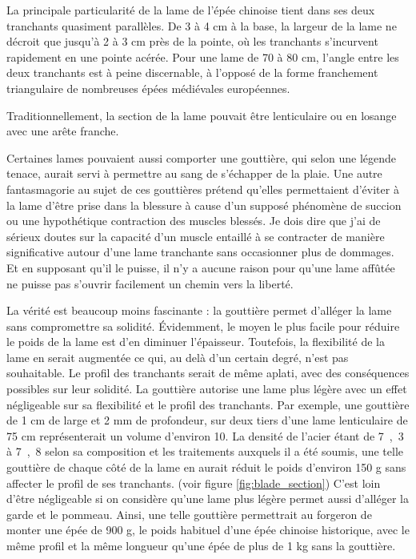 La principale particularité de la lame de l'épée chinoise tient dans ses deux tranchants quasiment parallèles. De 3 à 4 cm à la base, la largeur de la lame ne décroit que jusqu'à 2 à 3 cm près de la pointe, où les tranchants s'incurvent rapidement en une pointe acérée. 
Pour une lame de 70 à 80 cm, l'angle entre les deux tranchants est à peine discernable, à l'opposé de la forme franchement triangulaire de nombreuses épées médiévales européennes. 

Traditionnellement, la section de la lame pouvait être lenticulaire ou en losange avec une arête franche. 

Certaines lames pouvaient aussi comporter une gouttière, qui selon une légende tenace, aurait servi à permettre au sang de s'échapper de la plaie.
Une autre fantasmagorie au sujet de ces gouttières prétend qu'elles permettaient d'éviter à la lame d'être prise dans la blessure à cause d'un supposé phénomène de succion ou une hypothétique contraction des muscles blessés.
Je dois dire que j'ai de sérieux doutes sur la capacité d'un muscle entaillé à se contracter de manière significative autour d'une lame tranchante sans occasionner plus de dommages. Et en supposant qu'il le puisse, il n'y a aucune raison pour qu'une lame affûtée ne puisse pas s'ouvrir facilement un chemin vers la liberté.

La vérité est beaucoup moins fascinante : la gouttière permet d'alléger la lame sans compromettre sa solidité. \'{E}videmment, le moyen le plus facile pour réduire le poids de la lame est d'en diminuer l'épaisseur. Toutefois, la flexibilité de la lame en serait augmentée ce qui, au delà d'un certain degré, n'est pas souhaitable. Le profil des tranchants serait de même aplati, avec des conséquences possibles sur leur solidité. 
La gouttière autorise une lame plus légère avec un effet négligeable sur sa flexibilité et le profil des tranchants.
Par exemple, une gouttière de 1 cm de large et 2 mm de profondeur, sur deux tiers d'une lame lenticulaire de 75 cm représenterait un volume d'environ \unit{10}{\centi\meter\cubed}. La densité de l'acier étant de \unit{7,3}{\kilo\gram \per \deci\meter\cubed} à \unit{7,8}{\kilo\gram \per \deci\meter\cubed} selon sa composition et les traitements auxquels il a été soumis, une telle gouttière de chaque côté de la lame en aurait réduit le poids d'environ 150 g sans affecter le profil de ses tranchants. (voir figure \ref{fig:blade_section}) 
C'est loin d'être négligeable si on considère qu'une lame plus légère permet aussi d'alléger la garde et le pommeau. Ainsi, une telle gouttière permettrait au forgeron de monter une épée de 900 g, le poids habituel d'une épée chinoise historique, avec le même profil et la même longueur qu'une épée de plus de 1 kg sans la gouttière.

